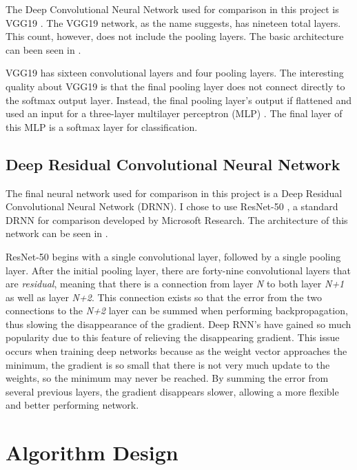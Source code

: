 \documentclass[12pt]{article}
\begin{document}
The Deep Convolutional Neural Network used for comparison in this project is VGG19 \cite{vgg}. The VGG19 network, as the name suggests, has nineteen total layers. This count, however, does not include the pooling layers. The basic architecture can been seen in . 

VGG19 has sixteen convolutional layers and four pooling layers. The interesting quality about VGG19 is that the final pooling layer does not connect directly to the softmax output layer. Instead, the final pooling layer's output if flattened and used an input for a three-layer multilayer perceptron (MLP) \cite{ci_book}. The final layer of this MLP is a softmax layer for classification. 

		\subsection{Deep Residual Convolutional Neural Network}

The final neural network used for comparison in this project is a Deep Residual Convolutional Neural Network (DRNN). I chose to use ResNet-50 \cite{resnet50}, a standard DRNN for comparison developed by Microsoft Research. The architecture of this network can be seen in .

ResNet-50 begins with a single convolutional layer, followed by a single pooling layer. After the initial pooling layer, there are forty-nine convolutional layers that are \textit{residual}, meaning that there is a connection from layer \textit{N} to both layer \textit{N+1} as well as layer \textit{N+2}. This connection exists so that the error from the two connections to the \textit{N+2} layer can be summed when performing backpropagation, thus slowing the disappearance of the gradient. Deep RNN's have gained so much popularity due to this feature of relieving the disappearing gradient. This issue occurs when training deep networks because as the weight vector approaches the minimum, the gradient is so small that there is not very much update to the weights, so the minimum may never be reached. By summing the error from several previous layers, the gradient disappears slower, allowing a more flexible and better performing network. 
	
	\section{Algorithm Design}
	
\end{document}
